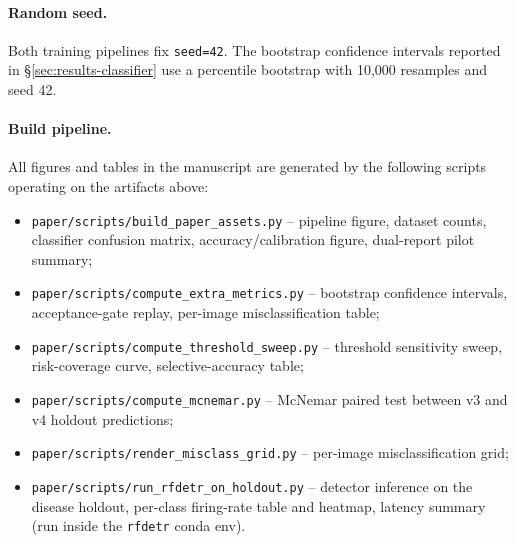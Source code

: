 \paragraph{Random seed.}
Both training pipelines fix \texttt{seed=42}. The bootstrap confidence
intervals reported in \S\ref{sec:results-classifier} use a percentile
bootstrap with 10{,}000 resamples and seed 42.

\paragraph{Build pipeline.}
All figures and tables in the manuscript are generated by the following
scripts operating on the artifacts above:
\begin{itemize}[leftmargin=1.3em]
\item \texttt{paper/scripts/build\_paper\_assets.py} -- pipeline figure,
dataset counts, classifier confusion matrix, accuracy/calibration
figure, dual-report pilot summary;
\item \texttt{paper/scripts/compute\_extra\_metrics.py} -- bootstrap
confidence intervals, acceptance-gate replay, per-image
misclassification table;
\item \texttt{paper/scripts/compute\_threshold\_sweep.py} -- threshold
sensitivity sweep, risk-coverage curve, selective-accuracy table;
\item \texttt{paper/scripts/compute\_mcnemar.py} -- McNemar paired test
between v3 and v4 holdout predictions;
\item \texttt{paper/scripts/render\_misclass\_grid.py} -- per-image
misclassification grid;
\item \texttt{paper/scripts/run\_rfdetr\_on\_holdout.py} -- detector
inference on the disease holdout, per-class firing-rate table and
heatmap, latency summary (run inside the \texttt{rfdetr} conda env).
\end{itemize}
